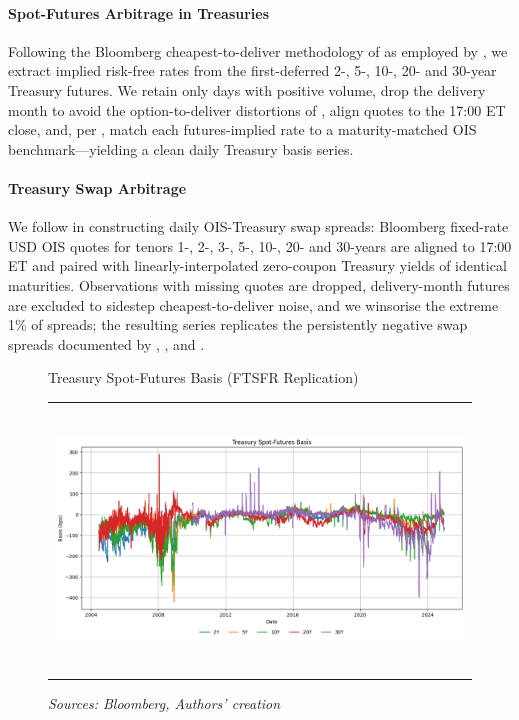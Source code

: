 \documentclass{article}
\begin{document}

\paragraph{Spot-Futures Arbitrage in Treasuries}
Following the Bloomberg cheapest-to-deliver methodology of \citet{Fleckenstein2020} as employed by \citet{Siriwardane2021}, we extract implied risk-free rates from the first-deferred 2-, 5-, 10-, 20- and 30-year Treasury futures.  We retain only days with positive volume, drop the delivery month to avoid the option-to-deliver distortions of \citet{Burghardt2005}, align quotes to the 17:00 ET close, and, per \citet{Barth2021}, match each futures-implied rate to a maturity-matched OIS benchmark—yielding a clean daily Treasury basis series.

\paragraph{Treasury Swap Arbitrage}
We follow \citet{Siriwardane2021} in constructing daily OIS-Treasury swap
spreads: Bloomberg fixed-rate USD OIS quotes for tenors 1-, 2-, 3-, 5-, 10-, 20-
and 30-years are aligned to 17:00 ET and paired with linearly-interpolated
zero-coupon Treasury yields of identical maturities.  Observations with missing
quotes are dropped, delivery-month futures are excluded to sidestep
cheapest-to-deliver noise, and we winsorise the extreme 1\% of spreads; the
resulting series replicates the persistently negative swap spreads documented by
\citet{Jermann2020}, \citet{Du2023}, and \citet{Hanson2023}.

\begin{figure}[h!]
    \centering
    \caption{Treasury Spot-Futures Basis (FTSFR Replication)}
  \begin{tabular}{@{}c@{}}
    \includegraphics[width=.7\linewidth,height=200pt,width=400pt]{../docs_src/treasury_spot_futures_arbitrage.png}
  \end{tabular}
  \caption*{\emph{Sources: Bloomberg, Authors' creation}}
  \label{fig:treasury_sf_basis}
\end{figure}
\end{document}
